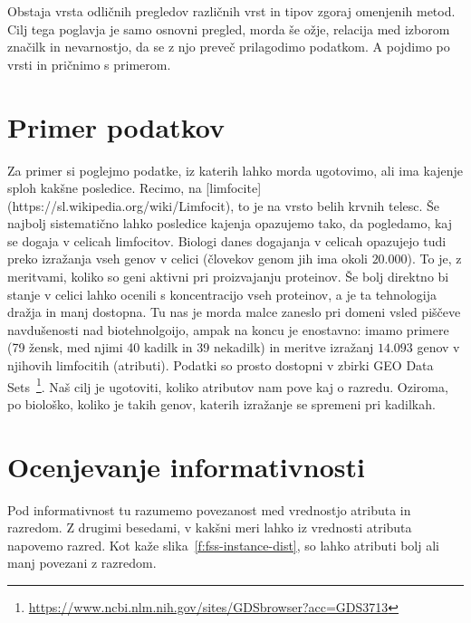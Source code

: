 Obstaja vrsta odličnih pregledov različnih vrst in tipov zgoraj omenjenih metod. Cilj tega poglavja je samo osnovni pregled, morda še ožje, relacija med izborom značilk in nevarnostjo, da se z njo preveč prilagodimo podatkom. A pojdimo po vrsti in pričnimo s primerom.

\section{Primer podatkov}

Za primer si poglejmo podatke, iz katerih lahko morda ugotovimo, ali ima kajenje sploh kakšne posledice. Recimo, na [limfocite](https://sl.wikipedia.org/wiki/Limfocit), to je na vrsto belih krvnih telesc. Še najbolj sistematično lahko posledice kajenja opazujemo tako, da pogledamo, kaj se dogaja v celicah limfocitov. Biologi danes dogajanja v celicah opazujejo tudi preko izražanja vseh genov v celici (človekov genom jih ima okoli $20.000$). To je, z meritvami, koliko so geni aktivni pri proizvajanju proteinov. Še bolj direktno bi stanje v celici lahko ocenili s koncentracijo vseh proteinov, a je ta tehnologija dražja in manj dostopna. Tu nas je morda malce zaneslo pri domeni vsled piščeve navdušenosti nad biotehnolgoijo, ampak na koncu je enostavno: imamo primere (79 žensk, med njimi 40 kadilk in 39 nekadilk) in meritve izražanj $14.093$ genov v njihovih limfocitih (atributi). Podatki so prosto dostopni v zbirki GEO Data Sets~\footnote{\url{https://www.ncbi.nlm.nih.gov/sites/GDSbrowser?acc=GDS3713}}. Naš cilj je ugotoviti, koliko atributov nam pove kaj o razredu. Oziroma, po biološko, koliko je takih genov, katerih izražanje se spremeni pri kadilkah.

\section{Ocenjevanje informativnosti}

Pod informativnost tu razumemo povezanost med vrednostjo atributa in razredom. Z drugimi besedami, v kakšni meri lahko iz vrednosti atributa napovemo razred. Kot kaže slika~\ref{f:fss-instance-dist}, so lahko atributi bolj ali manj povezani z razredom.

